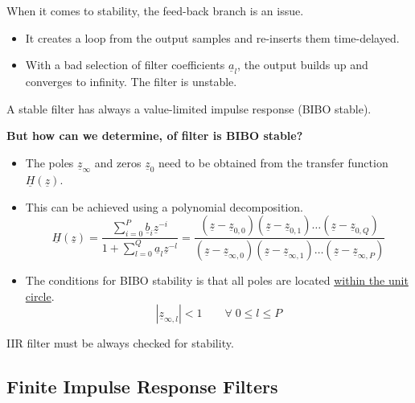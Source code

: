 \begin{refsection}
When it comes to stability, the feed-back branch is an issue.
\begin{itemize}
	\item It creates a loop from the output samples and re-inserts them time-delayed.
	\item With a bad selection of filter coefficients $\underline{a}_l$, the output builds up and converges to infinity. The filter is unstable.
\end{itemize}
A stable filter has always a value-limited impulse response (\ac{BIBO} stable).

\textbf{But how can we determine, of filter is \ac{BIBO} stable?}
\begin{itemize}
	\item The poles $\underline{z}_{\infty}$ and zeros $\underline{z}_{0}$ need to be obtained from the transfer function $\underline{H}(\underline{z})$.
	\item This can be achieved using a polynomial decomposition.
	\begin{equation}
		\underline{H}(\underline{z}) = \frac{\sum\limits_{i=0}^{P} \underline{b}_i \underline{z}^{-i}}{1 + \sum\limits_{l=0}^{Q} \underline{a}_l \underline{z}^{-l}} = \frac{\left(\underline{z}-\underline{z}_{0,0}\right)\left(\underline{z}-\underline{z}_{0,1}\right)\dots\left(\underline{z}-\underline{z}_{0,Q}\right)}{\left(\underline{z}-\underline{z}_{\infty,0}\right)\left(\underline{z}-\underline{z}_{\infty,1}\right)\dots\left(\underline{z}-\underline{z}_{\infty,P}\right)}
	\end{equation}
	\item The conditions for \ac{BIBO} stability is that all poles are located \underline{within the unit circle}.
	\begin{equation}
		\left|\underline{z}_{\infty,l}\right| < 1 \qquad \forall \; 0 \leq l \leq P
	\end{equation}
\end{itemize}

\begin{fact}
	\acs{IIR} filter must be always checked for stability.
\end{fact}


\subsection{Finite Impulse Response Filters}


\end{refsection}
